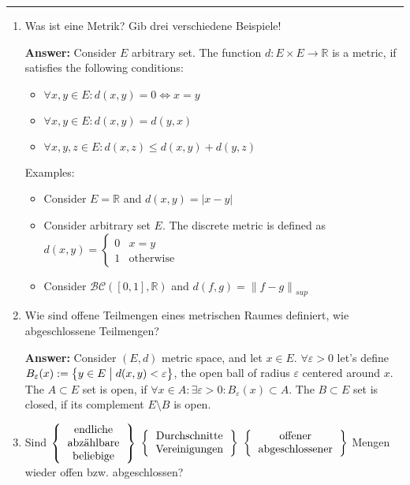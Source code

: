 \documentclass[11pt]{article}
\newcommand{\norm}[1]{\left\lVert#1\right\rVert}
\newcommand{\abs}[1]{\left|#1\right|}
\newcommand{\RR}[0]{\mathbb{R}}
\begin{document}


\medskip\hrule
\begin{enumerate}
    \item Was ist eine Metrik? Gib drei verschiedene Beispiele!

    \textbf{Answer:} Consider $E$ arbitrary set. The function $d: E \times E \to \RR$ is a metric, if satisfies the following conditions:
    \begin{itemize}
        \item $\forall x, y \in E\colon d(x, y) = 0 \Leftrightarrow x = y$
        \item $\forall x, y \in E\colon d(x, y) = d(y, x)$
        \item $\forall x, y, z \in E\colon d(x, z) \le d(x, y) + d(y, z)$
    \end{itemize}

    Examples:
    \begin{itemize}
        \item Consider $E = \RR$ and $d(x, y) = \abs{x -y}$
        \item Consider arbitrary set $E$. The discrete metric is defined as $d(x, y) = \begin{cases}
            0&x=y\\
            1&\text{otherwise}
        \end{cases}$
        \item Consider $\mathcal{BC}([0, 1], \RR)$ and $d(f, g) = \norm{f - g}_{sup}$
    \end{itemize}
    \item Wie sind offene Teilmengen eines metrischen Raumes definiert, wie abgeschlossene Teilmengen?

    \textbf{Answer:} Consider $(E, d)$ metric space, and let $x \in E$. $\forall \varepsilon > 0$ let's define $B_\varepsilon(x) := \left\{ y \in E \bigm | d(x, y) < \varepsilon\right\}$, the open ball of radius $\varepsilon$ centered around $x$. The $A \subset E$ set is open, if $\forall x \in A\colon \exists \varepsilon > 0\colon B_\varepsilon(x) \subset A$. The $B \subset E$ set is closed, if its complement $E \setminus B$ is open.
    \item Sind $\left\{\begin{tabular}{c}
        endliche\\
        abzählbare\\
        beliebige\\
    \end{tabular}\right\}$ $\left\{\begin{tabular}{c}
    Durchschnitte\\
    Vereinigungen
    \end{tabular}\right\}$ $\left\{\begin{tabular}{c}
        offener\\
        abgeschlossener
    \end{tabular}\right\}$ Mengen wieder offen bzw. abgeschlossen?


\end{enumerate}
\end{document}
